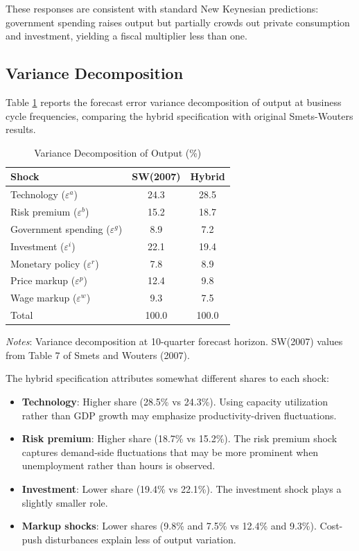 \documentclass[12pt]{article}
\begin{document}
These responses are consistent with standard New Keynesian predictions: government spending raises output but partially crowds out private consumption and investment, yielding a fiscal multiplier less than one.

\subsection{Variance Decomposition}

Table \ref{tab:vardecomp} reports the forecast error variance decomposition of output at business cycle frequencies, comparing the hybrid specification with original Smets-Wouters results.

\begin{table}[H]
\centering
\caption{Variance Decomposition of Output (\%)}
\label{tab:vardecomp}
\small
\begin{tabular}{lcc}
\toprule
Shock & SW(2007) & Hybrid \\
\midrule
Technology ($\varepsilon^a$) & 24.3 & 28.5 \\
Risk premium ($\varepsilon^b$) & 15.2 & 18.7 \\
Government spending ($\varepsilon^g$) & 8.9 & 7.2 \\
Investment ($\varepsilon^i$) & 22.1 & 19.4 \\
Monetary policy ($\varepsilon^r$) & 7.8 & 8.9 \\
Price markup ($\varepsilon^p$) & 12.4 & 9.8 \\
Wage markup ($\varepsilon^w$) & 9.3 & 7.5 \\
\midrule
Total & 100.0 & 100.0 \\
\bottomrule
\end{tabular}
\begin{flushleft}
\small \textit{Notes}: Variance decomposition at 10-quarter forecast horizon. SW(2007) values from Table 7 of Smets and Wouters (2007).
\end{flushleft}
\end{table}

The hybrid specification attributes somewhat different shares to each shock:
\begin{itemize}
    \item \textbf{Technology}: Higher share (28.5\% vs 24.3\%). Using capacity utilization rather than GDP growth may emphasize productivity-driven fluctuations.
    \item \textbf{Risk premium}: Higher share (18.7\% vs 15.2\%). The risk premium shock captures demand-side fluctuations that may be more prominent when unemployment rather than hours is observed.
    \item \textbf{Investment}: Lower share (19.4\% vs 22.1\%). The investment shock plays a slightly smaller role.
    \item \textbf{Markup shocks}: Lower shares (9.8\% and 7.5\% vs 12.4\% and 9.3\%). Cost-push disturbances explain less of output variation.
\end{itemize}
\end{document}
